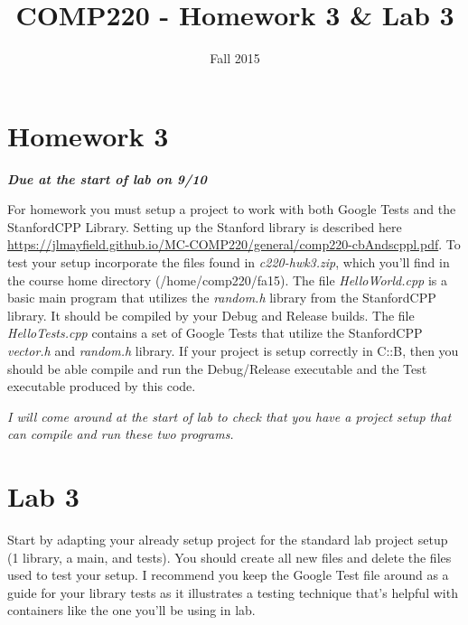 \documentclass[10pt]{article}
\title{COMP220 - Homework 3 \& Lab 3}
\author{ }
\date{Fall 2015}
\begin{document}
\maketitle

\begin{abstract}

\end{abstract}

\section{Homework 3}

\begin{center}
\textbf{\textit{Due at the start of lab on 9/10}}
\end{center}

For homework you must setup a project to work with both Google Tests and the StanfordCPP Library. Setting up the Stanford library is described here \url{https://jlmayfield.github.io/MC-COMP220/general/comp220-cbAndscppl.pdf}. To test your setup incorporate the files found in \textit{c220-hwk3.zip}, which you'll find in the course home directory (/home/comp220/fa15). The file \textit{HelloWorld.cpp} is a basic main program that utilizes the \textit{random.h} library from the StanfordCPP library. It should be compiled by your Debug and Release builds.  The file \textit{HelloTests.cpp} contains a set of Google Tests that utilize the StanfordCPP \textit{vector.h} and \textit{random.h} library. If your project is setup correctly in C::B, then you should be able compile and run the Debug/Release executable and the Test executable produced by this code. 

\textit{I will come around at the start of lab to check that you have a project setup that can compile and run these two programs.}

\section{Lab 3}

Start by adapting your already setup project for the standard lab project setup (1 library, a main, and tests).  You should create all new files and delete the files used to test your setup. I recommend you keep the Google Test file around as a guide for your library tests as it illustrates a testing technique that's helpful with containers like the one you'll be using in lab.
\end{document}
